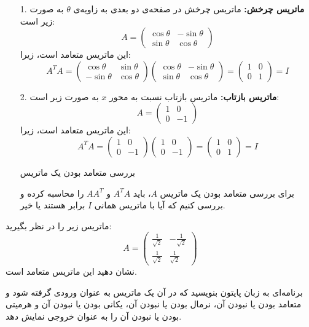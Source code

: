 \begin{example}
\begin{itemize}
	\item[1. ] 	
\textbf{ماتریس چرخش:}
ماتریس چرخش در صفحه‌ی دو بعدی به زاویه‌ی \( \theta \) به صورت زیر است:
\[
A = \begin{pmatrix}
	\cos \theta & -\sin \theta \\
	\sin \theta & \cos \theta
\end{pmatrix}
\]
این ماتریس متعامد است، زیرا:
\[
A^T A = \begin{pmatrix}
	\cos \theta & \sin \theta \\
	-\sin \theta & \cos \theta
\end{pmatrix} \begin{pmatrix}
	\cos \theta & -\sin \theta \\
	\sin \theta & \cos \theta
\end{pmatrix} = \begin{pmatrix}
	1 & 0 \\
	0 & 1
\end{pmatrix} = I
\]	

\item [2. ] 
\textbf{ماتریس بازتاب:}
ماتریس بازتاب نسبت به محور \( x \) به صورت زیر است:
\[
A = \begin{pmatrix}
	1 & 0 \\
	0 & -1
\end{pmatrix}
\]
این ماتریس متعامد است، زیرا:
\[
A^T A = \begin{pmatrix}
	1 & 0 \\
	0 & -1
\end{pmatrix} \begin{pmatrix}
	1 & 0 \\
	0 & -1
\end{pmatrix} = \begin{pmatrix}
	1 & 0 \\
	0 & 1
\end{pmatrix} = I
\]



بررسی متعامد بودن یک ماتریس

برای بررسی متعامد بودن یک ماتریس \( A \)، باید \( A^T A \) و \( A A^T \) را محاسبه کرده و بررسی کنیم که آیا با ماتریس همانی \( I \) برابر هستند یا خیر.
\end{itemize}	
\end{example}

\begin{exercise}
ماتریس زیر را در نظر بگیرید:
\[
A = \begin{pmatrix}
	\frac{1}{\sqrt{2}} & -\frac{1}{\sqrt{2}} \\
	\frac{1}{\sqrt{2}} & \frac{1}{\sqrt{2}}
\end{pmatrix}
\]
نشان دهید این ماتریس متعامد است.
\end{exercise}

\begin{exercise}
	برنامه‌ای به زبان پایتون بنویسید که در آن یک ماتریس به عنوان ورودی گرفته شود و متعامد بودن یا نبودن آن، نرمال بودن یا نبودن آن، یکانی بودن یا نبودن آن و هرمیتی بودن یا نبودن آن را به عنوان خروجی نمایش دهد.
\end{exercise}



